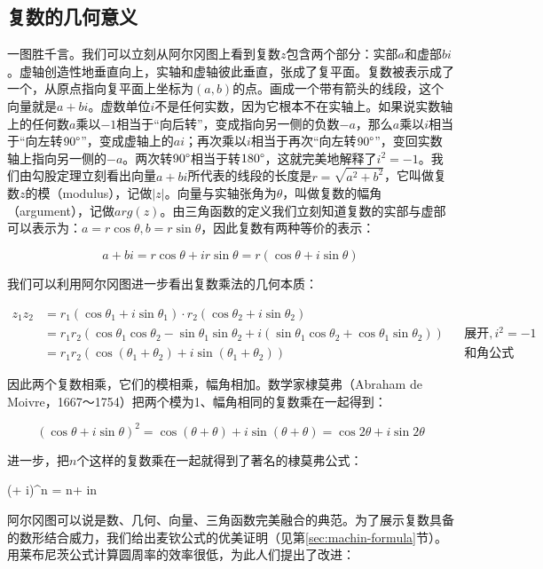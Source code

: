 \documentclass[b5paper]{ctexart}
\begin{document}
\subsection{复数的几何意义}

一图胜千言。我们可以立刻从阿尔冈图上看到复数$z$包含两个部分：实部$a$和虚部$bi$。虚轴创造性地垂直向上，实轴和虚轴彼此垂直，张成了复平面。复数被表示成了一个，从原点指向复平面上坐标为$(a, b)$的点。画成一个带有箭头的线段，这个向量就是$a + bi$。虚数单位$i$不是任何实数，因为它根本不在实轴上。如果说实数轴上的任何数$a$乘以$-1$相当于“向后转”，变成指向另一侧的负数$-a$，那么$a$乘以$i$相当于“向左转$90\degree$”，变成虚轴上的$ai$；再次乘以$i$相当于再次“向左转$90\degree$”，变回实数轴上指向另一侧的$-a$。两次转$90\degree$相当于转$180\degree$，这就完美地解释了$i^2 = -1$。我们由勾股定理立刻看出向量$a + bi$所代表的线段的长度是$r = \sqrt{a^2 + b^2}$，它叫做复数$z$的模（modulus），记做$|z|$。向量与实轴张角为$\theta$，叫做复数的幅角（argument），记做$arg(z)$。由三角函数的定义我们立刻知道复数的实部与虚部可以表示为：$a = r\cos\theta, b = r\sin\theta$，因此复数有两种等价的表示：

\[
a + bi = r\cos\theta + ir\sin\theta = r(\cos\theta + i\sin\theta)
\]

我们可以利用阿尔冈图进一步看出复数乘法的几何本质：

\begin{align*}
z_1z_2 &= r_1(\cos\theta_1 + i\sin\theta_1) \cdot r_2(\cos\theta_2 + i\sin\theta_2) \\
  &= r_1r_2(\cos\theta_1\cos\theta_2 - \sin\theta_1\sin\theta_2 + i(\sin\theta_1\cos\theta_2 + \cos\theta_1\sin\theta_2)) && \text{展开}, i^2 = -1 \\
  &= r_1r_2(\cos(\theta_1 + \theta_2) + i\sin(\theta_1 + \theta_2)) && \text{和角公式}
\end{align*}

\label{sec:proof-to-machin}
因此两个复数相乘，它们的模相乘，幅角相加。数学家棣莫弗（Abraham de Moivre，1667～1754）把两个模为1、幅角相同的复数乘在一起得到：

\[
(\cos \theta + i\sin \theta)^2 = \cos (\theta + \theta) + i\sin (\theta + \theta) = \cos 2\theta + i\sin 2\theta
\]

进一步，把$n$个这样的复数乘在一起就得到了著名的棣莫弗公式：

\be \label{eq:de-Moivre}
(\cos \theta + i\sin \theta)^n = \cos n\theta + i\sin n\theta
\ee

阿尔冈图可以说是数、几何、向量、三角函数完美融合的典范。为了展示复数具备的数形结合威力，我们给出麦钦公式的优美证明（见第\ref{sec:machin-formula}节）。用莱布尼茨公式计算圆周率的效率很低，为此人们提出了改进：
\end{document}
